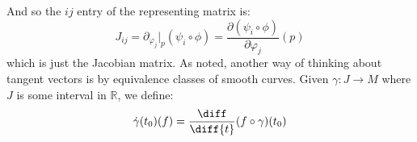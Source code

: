 \documentclass{book}                                                           %
\begin{document}
                And so the $ij$ entry of the representing matrix is:
                \begin{equation}
                    J_{ij}=\partial_{\varphi_{j}}|_{p}(\psi_{i}\circ\phi)
                    =\frac{\partial(\psi_{i}\circ\phi)}{\partial\varphi_{j}}(p)
                \end{equation}
                which is just the Jacobian matrix. As noted, another way of
                thinking about tangent vectors is by equivalence classes of
                smooth curves. Given $\gamma:J\rightarrow{M}$ where $J$ is some
                interval in $\mathbb{R}$, we define:
                \begin{equation}
                    \dot{\gamma}(t_{0})(f)
                        =\frac{\diff}{\diff{t}}(f\circ\gamma)(t_{0})
                \end{equation}
\end{document}
